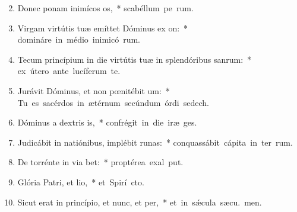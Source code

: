 \begin{flushleft}
\begin{enumerate}[leftmargin=*]
\setcounter{enumi}{1}

\item Donec ponam inimícos os,~* \mbox{scabéllum pe rum.}

\item Virgam virtútis tuæ emíttet Dóminus ex on:~* \mbox{domináre in médio inimicó rum.}

\item Tecum princípium in die virtútis tuæ in splendóribus sanrum:~* \mbox{ex útero ante lucíferum  te.}

\item Jurávit Dóminus, et non pœnitébit um:~* \mbox{Tu es sacérdos in ætérnum secúndum órdi sedech.}

\item Dóminus a dextris is,~* \mbox{confrégit in die iræ  ges.}

\item Judicábit in natiónibus, implébit runas:~* \mbox{conquassábit cápita in ter rum.}

\item De torrénte in via bet:~* \mbox{proptérea exal put.}

\item Glória Patri, et lio,~* \mbox{et Spirí cto.}

\item Sicut erat in princípio, et nunc, et per,~* \mbox{et in s\'{\ae}cula sæcu. men.}


\end{enumerate}
\end{flushleft}

